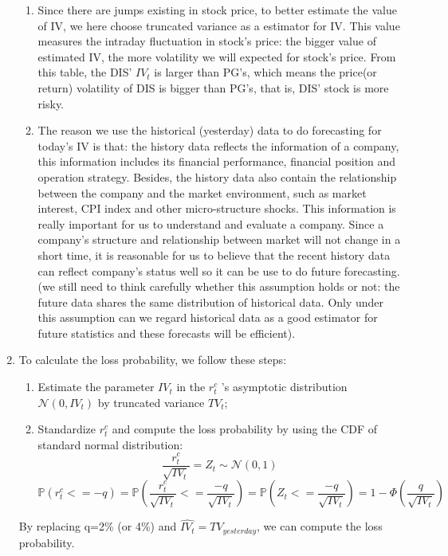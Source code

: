 \documentclass[12pt,letterpaper]{article}
\begin{document}
\begin{enumerate}[label=\textbf{(\Alph*)}]
\begin{enumerate}[label=(\roman*)]
\item Since there are jumps existing in stock price, to better estimate the value of IV, we here choose truncated variance as a estimator for IV. This value measures the intraday fluctuation in stock's price: the bigger value of estimated IV, the more volatility we will expected for stock's price. From this table, the DIS' $IV_t$ is larger than PG's, which means the price(or return) volatility of DIS is bigger than PG's, that is, DIS' stock is more risky.

\item The reason we use the historical (yesterday) data to  do forecasting for today's IV is that: the history data reflects the information of a company, this information includes its financial performance, financial position and operation strategy. Besides, the history data also contain the relationship between the company and the market environment, such as market interest, CPI index and other micro-structure shocks. This information is really important for us to understand and evaluate a company. Since a company's structure and relationship between market will not change in a short time, it is reasonable for us to believe that the recent history data can reflect company's status well so it can be use to do future forecasting. (we still need to think carefully whether this assumption holds or not: the future data shares the same distribution of historical data. Only under this assumption can we regard historical data as a good estimator for future statistics and these forecasts will be efficient).  
 \end{enumerate}
 \item 
 To calculate the loss probability, we follow these steps:
 \begin{enumerate}[label=(\roman*)]
 \item Estimate the parameter ${IV_t}$ in the $r_t^c$ 's asymptotic distribution $\mathcal{N}(0,IV_t)$ by truncated variance $TV_t$;
 \item Standardize $r_t^c$ and compute the loss probability by using the CDF of standard normal distribution:
 $$\frac{r_t^c}{\sqrt{IV_t}}=Z_t \sim \mathcal{N}(0,1)$$
 $$\mathbb{P}(r_t^c <= -q)=\mathbb{P}(\frac{r_t^c}{\sqrt{IV_t}}<=\frac{-q}{\sqrt{IV_t}})=\mathbb{P}(Z_t<=\frac{-q}{\sqrt{IV_t}})=1-\Phi(\frac{q}{\sqrt{IV_t}})$$
 \end{enumerate}
 
 By replacing q=2\% (or 4\%) and $\hat{IV_t}=TV_{yesterday}$, we can compute the loss probability.\\
 \vspace{5mm}
 

\end{enumerate}
\end{document}
